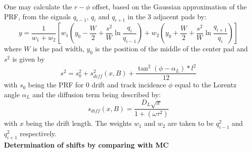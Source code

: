 \documentclass{alicetdr}
\begin{document}
One may calculate the $r-\phi$ offset, based on the Gaussian approximation of
the PRF, from the signals $q_{i-1}$, $q_i$ and $q_{i+1}$ in the 3 adjacent pads
by:
\begin{equation}
y = \frac{1}{w_{1}+w_{2}} \left[ w_{1} \left( y_{0}-\frac{W}{2}
                                                   +\frac{s^{2}}{W}
                                                    \ln\frac{q_{i}}{q_{i-1}} \right)
                                + w_{2}\left( y_{0}+\frac{W}{2}
                                                   +\frac{s^{2}}{W}
                                                    \ln\frac{q_{i+1}}{q_{i}} \right) \right]
\end{equation}
where $W$ is the pad width, $y_0$ is the position of the middle of the center
pad and $s^2$ is given by
\begin{equation}
s^{2} = s^{2}_{0} + s^{2}_{diff} (x,B) + \frac{\tan^{2}(\phi-\alpha_{L})*l^{2}}{12}
\end{equation}
with $s_0$ being the PRF for 0 drift and track incidence $\phi$ equal to the Lorentz
angle $\alpha_L$ and the diffusion term being described by:
\begin{equation}
s_{diff} (x,B) = \frac{D_{L}\sqrt{x}}{1+({\omega\tau}^{2})}
\end{equation}
with $x$ being the drift length. The weights $w_1$ and $w_2$ are taken to be
$q_{i-1}^2$ and $q_{i+1}^2$ respectively.
\\

\noindent
{\bf Determination of shifts by comparing with MC}
\\
\end{document}
